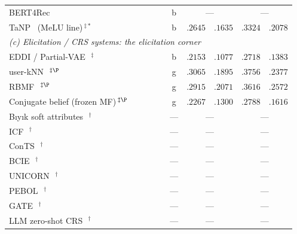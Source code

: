 \documentclass[acmsmall,review,anonymous]{acmart}
\newcommand{\cmark}{\ding{51}}
\newcommand{\xmark}{\ding{55}}
\begin{document}
\begin{table}[t]
\begin{tabular}{p{4.9cm}cccc c r@{\,/\,}l r@{\,/\,}l}
BERT4Rec~\citep{sun2019bert4rec} & \xmark & \xmark & \xmark & \xmark & b & \multicolumn{2}{c}{---} & \multicolumn{2}{c}{---} \\
TaNP~\citep{lin2021tanp} (MeLU line)\,$^{\ddagger\ast}$ & \xmark & \xmark & \xmark & \cmark & b & $.2645$ & $.1635$ & $.3324$ & $.2078$ \\
\midrule
\multicolumn{10}{l}{\emph{(c) Elicitation / CRS systems: the elicitation corner}}\\
EDDI / Partial-VAE~\citep{ma2019eddi}\,$^{\ddagger}$ & \xmark & \xmark & \xmark & \cmark & b & $.2153$ & $.1077$ & $.2718$ & $.1383$ \\
user-kNN~\citep{golbandi2011adaptive}\,$^{\ddagger\P}$ & \xmark & \xmark & \xmark & \cmark & g & $.3065$ & $.1895$ & $.3756$ & $.2377$ \\
RBMF~\citep{liu2011wisdom,zhou2011functional}\,$^{\ddagger\P}$ & \xmark & \xmark & \xmark & \cmark & g & $.2915$ & $.2071$ & $.3616$ & $.2572$ \\
Conjugate belief (frozen MF)\,$^{\ddagger\P}$ & \xmark & \xmark & \xmark & \cmark & g & $.2267$ & $.1300$ & $.2788$ & $.1616$ \\
B\i y\i k soft attributes~\citep{biyik2023soft}\,$^{\dagger}$ & \xmark & \xmark & \xmark & \cmark & --- & \multicolumn{2}{c}{---} & \multicolumn{2}{c}{---} \\
ICF~\citep{zhao2013interactive}\,$^{\dagger}$ & \xmark & \xmark & \xmark & \cmark & --- & \multicolumn{2}{c}{---} & \multicolumn{2}{c}{---} \\
ConTS~\citep{li2021seamlessly}\,$^{\dagger}$ & \xmark & \xmark & \xmark & \xmark & --- & \multicolumn{2}{c}{---} & \multicolumn{2}{c}{---} \\
BCIE~\citep{toroghi2023bcie}\,$^{\dagger}$ & \xmark & \xmark & \cmark & \xmark & --- & \multicolumn{2}{c}{---} & \multicolumn{2}{c}{---} \\
UNICORN~\citep{deng2021unicorn}\,$^{\dagger}$ & \xmark & \xmark & \xmark & \xmark & --- & \multicolumn{2}{c}{---} & \multicolumn{2}{c}{---} \\
PEBOL~\citep{austin2024bayesian}\,$^{\dagger}$ & \xmark & \cmark & \xmark & \xmark & --- & \multicolumn{2}{c}{---} & \multicolumn{2}{c}{---} \\
GATE~\citep{li2023eliciting}\,$^{\dagger}$ & \xmark & \cmark & \xmark & \cmark & --- & \multicolumn{2}{c}{---} & \multicolumn{2}{c}{---} \\
LLM zero-shot CRS~\citep{he2023large}\,$^{\dagger}$ & \xmark & \cmark & \xmark & \cmark & --- & \multicolumn{2}{c}{---} & \multicolumn{2}{c}{---} \\

\end{tabular}
\end{table}
\end{document}

